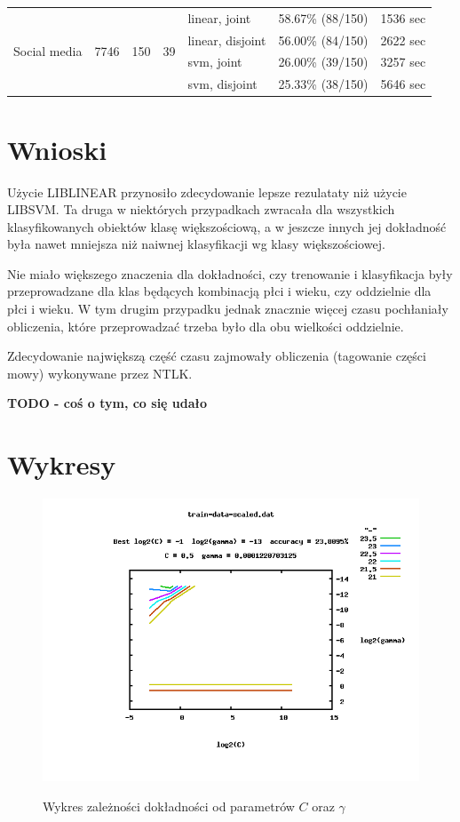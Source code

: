 \documentclass{article}
\begin{document}
\begin{adjustwidth}{-3.5cm}{-0cm}
\begin{tabular}{|p{2cm}|p{2cm}|p{2cm}|p{2cm}|p{3cm}|p{3cm}|p{3cm}|}
\multirow{4}{*}{Social media} & \multirow{4}{*}{7746} & \multirow{4}{*}{150} & \multirow{4}{*}{39} & 
linear, joint & 58.67\% (88/150) & 1536  sec \\  \cline{5-7}
& & & & 
linear, disjoint & 56.00\% (84/150) & 2622 sec \\  \cline{5-7}
& & & & 
svm, joint & 26.00\% (39/150) & 3257 sec \\  \cline{5-7}
& & & & 
svm, disjoint & 25.33\% (38/150) & 5646 sec \\  \hline


\end{tabular}

\end{adjustwidth}

\section{Wnioski}

Użycie LIBLINEAR przynosiło zdecydowanie lepsze rezulataty niż użycie LIBSVM. Ta druga w niektórych przypadkach zwracała dla wszystkich klasyfikowanych obiektów klasę większościową, a w jeszcze innych jej dokładność była nawet mniejsza niż naiwnej klasyfikacji wg klasy większościowej.

Nie miało większego znaczenia dla dokładności, czy trenowanie i klasyfikacja były przeprowadzane dla klas będących kombinacją płci i wieku, czy oddzielnie dla płci i wieku. W tym drugim przypadku jednak znacznie więcej czasu pochłaniały obliczenia, które przeprowadzać trzeba było dla obu wielkości oddzielnie.

Zdecydowanie największą część czasu zajmowały obliczenia (tagowanie części mowy) wykonywane przez NTLK.

\textbf{TODO - coś o tym, co się udało}

\section{Wykresy}

\begin{figure}[h]
\centering
\includegraphics[scale=1.0]{logc_loggamma_acc}\label{fig:chart}
\caption{Wykres zależności dokładności od parametrów $C$ oraz $\gamma$}
\end{figure}
\end{document}
